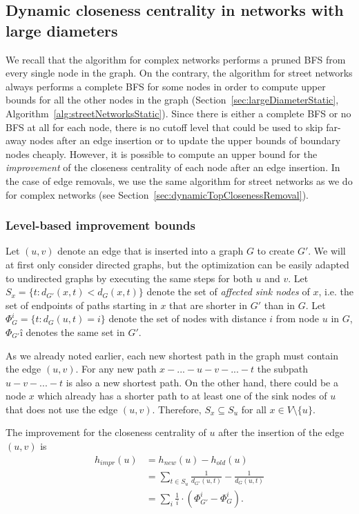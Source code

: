 \subsection{Dynamic closeness centrality in networks with large diameters}
We recall that the algorithm for complex networks performs a pruned BFS from every single node in the graph. On the contrary, the algorithm for street networks always performs a complete BFS for some nodes in order to compute upper bounds for all the other nodes in the graph (Section~\ref{sec:largeDiameterStatic}, Algorithm~\ref{alg:streetNetworksStatic}). Since there is either a complete BFS or no BFS at all for each node, there is no cutoff level that could be used to skip far-away nodes after an edge insertion or to update the upper bounds of boundary nodes cheaply. However, it is possible to compute an upper bound for the \emph{improvement} of the closeness centrality of each node after an edge insertion. In the case of edge removals, we use the same algorithm for street networks as we do for complex networks (see Section~\ref{sec:dynamicTopClosenessRemoval}).

\subsubsection{Level-based improvement bounds}
\label{sec:levelBasedImprovementBounds}
Let $(u, v)$ denote an edge that is inserted into a graph $G$ to create $G'$. We will at first only consider directed graphs, but the optimization can be easily adapted to undirected graphs by executing the same steps for both $u$ and $v$.  Let $S_{x} = \{t : d_{G'}(x, t) < d_G(x, t)\}$ denote the set of \emph{affected sink nodes} of $x$, i.e. the set of endpoints of paths starting in $x$ that are shorter in $G'$ than in $G$. Let $\Phi_{G}^i = \{t : d_G(u, t) = i\}$ denote the set of nodes with distance $i$ from node $u$ in $G$, $\Phi_{G'}î$ denotes the same set in $G'$.

As we already noted earlier, each new shortest path in the graph must contain the edge $(u, v)$. For any new path $x - ... - u - v - ... - t$ the subpath $u - v - ... - t$ is also a new shortest path. On the other hand, there could be a node $x$ which already has a shorter path to at least one of the sink nodes of $u$ that does not use the edge $(u, v)$. Therefore, $S_x \subseteq S_u$ for all $x \in V \setminus \{u\}$.

\begin{definition}
The improvement for the closeness centrality of $u$ after the insertion of the edge $(u, v)$ is 
\begin{align}
	h_{impr}(u) &= h_{new}(u) - h_{old}(u) \nonumber \\
	            &= \sum_{t \in S_u}{\frac{1}{d_{G'}(u, t)} - \frac{1}{d_G(u, t)}} \nonumber \\
	            &= \sum_{i}{\frac{1}{i} \cdot \left(\Phi_{G'}^i - \Phi_G^i\right)} \label{eq:levelImprovementBound}.
\end{align}
\end{definition}

